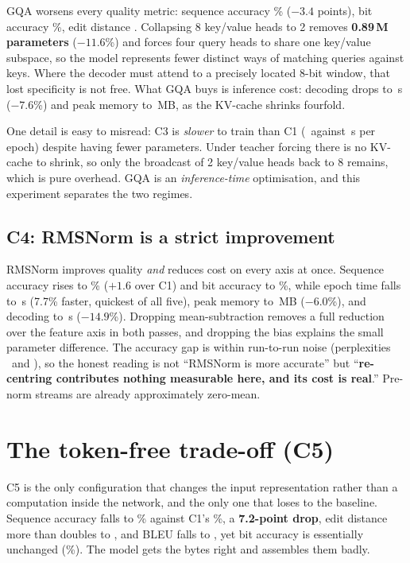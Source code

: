 GQA worsens every quality metric: sequence accuracy \CfgThreeSeq\% ($-3.4$
points), bit accuracy \CfgThreeBit\%, edit distance \CfgThreeLev. Collapsing 8
key/value heads to 2 removes \textbf{0.89\,M parameters} ($-11.6$\%) and forces
four query heads to share one key/value subspace, so the model represents fewer
distinct ways of matching queries against keys. Where the decoder must attend to
a precisely located 8-bit window, that lost specificity is not free. What GQA
buys is inference cost: decoding drops to \CfgThreeGen\,s ($-7.6$\%) and peak
memory to \CfgThreeMem\,MB, as the KV-cache shrinks fourfold.

One detail is easy to misread: C3 is \emph{slower} to train than C1
(\CfgThreeSec\ against \CfgOneSec\,s per epoch) despite having fewer parameters.
Under teacher forcing there is no KV-cache to shrink, so only the broadcast of 2
key/value heads back to 8 remains, which is pure overhead. GQA is an
\emph{inference-time} optimisation, and this experiment separates the two regimes.

\subsection{C4: RMSNorm is a strict improvement}

RMSNorm improves quality \emph{and} reduces cost on every axis at once. Sequence
accuracy rises to \CfgFourSeq\% ($+1.6$ over C1) and bit accuracy to
\CfgFourBit\%, while epoch time falls to \CfgFourSec\,s (7.7\% faster, quickest
of all five), peak memory to \CfgFourMem\,MB ($-6.0$\%), and decoding to
\CfgFourGen\,s ($-14.9$\%). Dropping mean-subtraction removes a full reduction
over the feature axis in both passes, and dropping the bias explains the small
parameter difference. The accuracy gap is within run-to-run noise (perplexities
\CfgFourPpl\ and \CfgOnePpl), so the honest reading is not ``RMSNorm is more
accurate'' but ``\textbf{re-centring contributes nothing measurable here, and its
cost is real}.'' Pre-norm streams are already approximately zero-mean.

\section{The token-free trade-off (C5)}
\label{sec:blt}

C5 is the only configuration that changes the input representation rather than a
computation inside the network, and the only one that loses to the baseline.
Sequence accuracy falls to \CfgFiveSeq\% against C1's \CfgOneSeq\%, a
\textbf{7.2-point drop}, edit distance more than doubles to \CfgFiveLev, and BLEU
falls to \CfgFiveBleu, yet bit accuracy is essentially unchanged
(\CfgFiveBit\%). The model gets the bytes right and assembles them badly.

